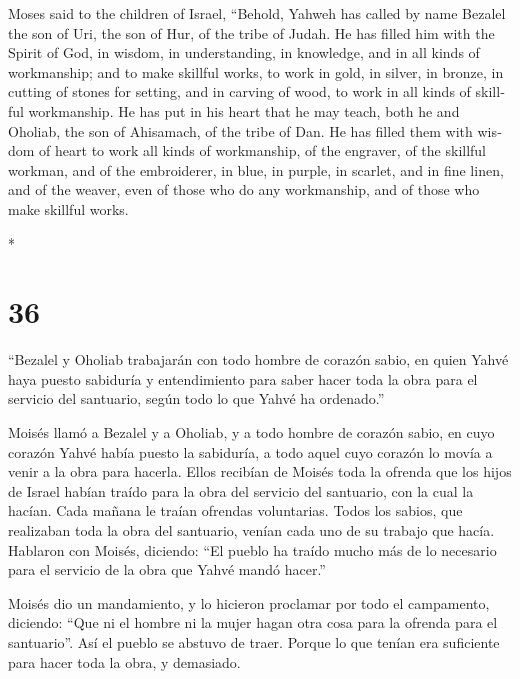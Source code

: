 \begin{paracol}{2}
\begin{otherlanguage}{english}
 Moses said to the children of Israel, ``Behold, Yahweh
has called by name Bezalel the son of Uri, the son of Hur, of the tribe
of Judah.  He has filled him with the Spirit of God, in
wisdom, in understanding, in knowledge, and in all kinds of workmanship;
 and to make skillful works, to work in gold, in silver,
in bronze,  in cutting of stones for setting, and in
carving of wood, to work in all kinds of skillful workmanship.
 He has put in his heart that he may teach, both he and
Oholiab, the son of Ahisamach, of the tribe of Dan.  He
has filled them with wisdom of heart to work all kinds of workmanship,
of the engraver, of the skillful workman, and of the embroiderer, in
blue, in purple, in scarlet, and in fine linen, and of the weaver, even
of those who do any workmanship, and of those who make skillful works.

\end{otherlanguage}

\switchcolumn[0]*

\hypertarget{section-70}{%
\section{36}\label{section-70}}

 ``Bezalel y Oholiab trabajarán con todo hombre de corazón
sabio, en quien Yahvé haya puesto sabiduría y entendimiento para saber
hacer toda la obra para el servicio del santuario, según todo lo que
Yahvé ha ordenado.''

 Moisés llamó a Bezalel y a Oholiab, y a todo hombre de
corazón sabio, en cuyo corazón Yahvé había puesto la sabiduría, a todo
aquel cuyo corazón lo movía a venir a la obra para hacerla.
 Ellos recibían de Moisés toda la ofrenda que los hijos de
Israel habían traído para la obra del servicio del santuario, con la
cual la hacían. Cada mañana le traían ofrendas voluntarias.
 Todos los sabios, que realizaban toda la obra del
santuario, venían cada uno de su trabajo que hacía. 
Hablaron con Moisés, diciendo: ``El pueblo ha traído mucho más de lo
necesario para el servicio de la obra que Yahvé mandó hacer.''

 Moisés dio un mandamiento, y lo hicieron proclamar por
todo el campamento, diciendo: ``Que ni el hombre ni la mujer hagan otra
cosa para la ofrenda para el santuario''. Así el pueblo se abstuvo de
traer.  Porque lo que tenían era suficiente para hacer
toda la obra, y demasiado.


\end{paracol}
